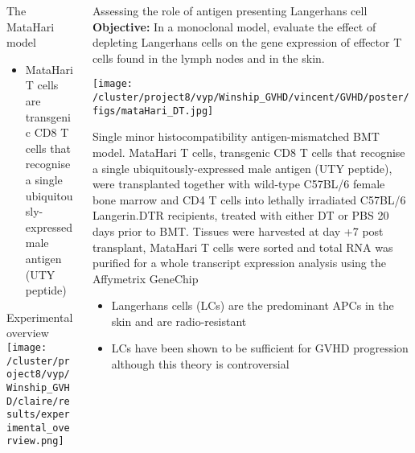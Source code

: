 \documentclass[final,hyperref={pdfpagelabels=false}]{beamer}
\begin{document}
\begin{frame}{}
\begin{columns}[t]
\begin{column}{.26\linewidth}
	\begin{block}{The MataHari model}  %
 {\small	\begin{itemize}
	\item MataHari T cells are transgenic CD8 T cells that recognise a single ubiquitously-expressed male antigen (UTY peptide)
	\end{itemize}}
	\end{block}

	\begin{block}{Experimental overview}
	  \texttt{[image: /cluster/project8/vyp/Winship\_GVHD/claire/results/experimental\_overview.png]}
	\end{block}
      \end{column}



      \begin{column}{.36\linewidth}
        \begin{block}{Assessing the role of antigen presenting Langerhans cell}
	  {\bf Objective:} In a monoclonal model, evaluate the effect of depleting Langerhans cells on the gene expression of effector T cells found in the lymph nodes and in the skin.


	  \begin{minipage}{20cm}
	   \texttt{[image: /cluster/project8/vyp/Winship\_GVHD/vincent/GVHD/poster/figs/mataHari\_DT.jpg]}
            \end{minipage}
	  \begin{minipage}{20cm}
	    {\tiny Single minor histocompatibility antigen-mismatched BMT model. MataHari T cells, transgenic CD8 T cells that recognise a single ubiquitously-expressed male antigen (UTY peptide), were transplanted together with wild-type C57BL/6 female bone marrow and CD4 T cells into lethally irradiated C57BL/6 Langerin.DTR recipients, treated with either DT or PBS 20 days prior to BMT. Tissues were harvested at day +7 post transplant, MataHari T cells were sorted and total RNA was purified for a whole transcript expression analysis using the Affymetrix GeneChip}
            \end{minipage}



 {\small	\begin{itemize} %
	\item Langerhans cells (LCs) are the predominant APCs in the skin and are radio-resistant  
	\item LCs have been shown to be sufficient for GVHD progression although this theory is controversial  
\end{itemize}}


\end{block}
\end{column}
\end{columns}
\end{frame}
\end{document}
